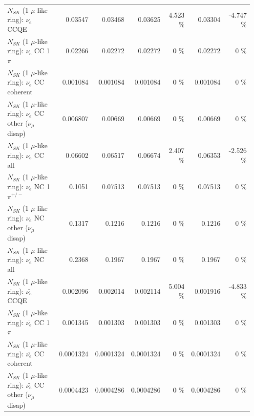 \begin{table}
\begin{tabular}{| l | r | r | r  r | r  r |}
\hline
\hline
\hline
                                      $N_{SK}$ (1 $\mu$-like ring): $\nu_e$ CCQE &         0.03547 &         0.03468 &         0.03625 &    4.523 \%  &         0.03304 &   -4.747 \%  \\ 
                                 $N_{SK}$ (1 $\mu$-like ring): $\nu_e$ CC 1$\pi$ &         0.02266 &         0.02272 &         0.02272 &        0 \%  &         0.02272 &        0 \%  \\ 
                               $N_{SK}$ (1 $\mu$-like ring): $\nu_e$ CC coherent &        0.001084 &        0.001084 &        0.001084 &        0 \%  &        0.001084 &        0 \%  \\ 
                $N_{SK}$ (1 $\mu$-like ring): $\nu_e$ CC other ($\nu_\mu$ disap) &        0.006807 &         0.00669 &         0.00669 &        0 \%  &         0.00669 &        0 \%  \\ 
                                  $N_{SK}$ (1 $\mu$-like ring): $\nu_{e}$ CC all &         0.06602 &         0.06517 &         0.06674 &    2.407 \%  &         0.06353 &   -2.526 \%  \\ 
\hline
                           $N_{SK}$ (1 $\mu$-like ring): $\nu_e$ NC 1$\pi^{+/-}$ &          0.1051 &         0.07513 &         0.07513 &        0 \%  &         0.07513 &        0 \%  \\ 
                $N_{SK}$ (1 $\mu$-like ring): $\nu_e$ NC other ($\nu_\mu$ disap) &          0.1317 &          0.1216 &          0.1216 &        0 \%  &          0.1216 &        0 \%  \\ 
                                  $N_{SK}$ (1 $\mu$-like ring): $\nu_{e}$ NC all &          0.2368 &          0.1967 &          0.1967 &        0 \%  &          0.1967 &        0 \%  \\ 
\hline
\hline
\hline
                                $N_{SK}$ (1 $\mu$-like ring): $\bar{\nu_e}$ CCQE &        0.002096 &        0.002014 &        0.002114 &    5.004 \%  &        0.001916 &   -4.833 \%  \\ 
                           $N_{SK}$ (1 $\mu$-like ring): $\bar{\nu_e}$ CC 1$\pi$ &        0.001345 &        0.001303 &        0.001303 &        0 \%  &        0.001303 &        0 \%  \\ 
                         $N_{SK}$ (1 $\mu$-like ring): $\bar{\nu_e}$ CC coherent &       0.0001324 &       0.0001324 &       0.0001324 &        0 \%  &       0.0001324 &        0 \%  \\ 
          $N_{SK}$ (1 $\mu$-like ring): $\bar{\nu_e}$ CC other ($\nu_\mu$ disap) &       0.0004423 &       0.0004286 &       0.0004286 &        0 \%  &       0.0004286 &        0 \%  \\ 

\end{tabular}
\end{table}
